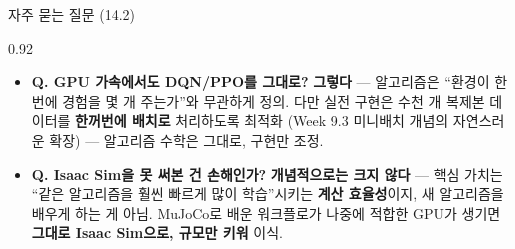\begin{frame}{자주 묻는 질문 (14.2)}
\begin{center}\begin{varwidth}{0.92\textwidth}
  \small
  \begin{itemize}
    \item \textbf{Q. GPU 가속에서도 DQN/PPO를 그대로?}
      \textbf{그렇다} --- 알고리즘은 ``환경이 한 번에 경험을
      몇 개 주는가''와 무관하게 정의. 다만 실전 구현은 수천 개
      복제본 데이터를 \textbf{한꺼번에 배치로} 처리하도록 최적화
      (Week 9.3 미니배치 개념의 자연스러운 확장) --- 알고리즘
      수학은 그대로, 구현만 조정.
    \item \textbf{Q. Isaac Sim을 못 써본 건 손해인가?}
      \textbf{개념적으로는 크지 않다} --- 핵심 가치는
      ``같은 알고리즘을 훨씬 빠르게 많이 학습''시키는
      \textbf{계산 효율성}이지, 새 알고리즘을 배우게 하는 게
      아님. MuJoCo로 배운 워크플로가 나중에 적합한 GPU가
      생기면 \textbf{그대로 Isaac Sim으로, 규모만 키워} 이식.
  \end{itemize}
\end{varwidth}\end{center}
\end{frame}
